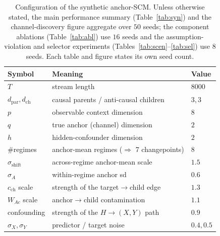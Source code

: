 \documentclass[authoryear,preprint,12pt]{elsarticle}
\theoremstyle{plain}
\theoremstyle{remark}
\begin{document}
\begin{table}[htbp]
\centering
\caption{Configuration of the synthetic anchor-SCM. Unless otherwise stated, the
main performance summary (Table~\ref{tab:syn}) and the channel-discovery figure
aggregate over $50$ seeds; the component ablations (Table~\ref{tab:abl}) use $16$
seeds and the assumption-violation and selector experiments
(Tables~\ref{tab:scen}--\ref{tab:sel}) use $8$ seeds. Each table and figure states
its own seed count.}
\label{tab:scm}
\small
\begin{tabular}{lll}
\toprule
Symbol & Meaning & Value\\
\midrule
$T$ & stream length & $8000$\\
$d_{\mathrm{par}},d_{\mathrm{ch}}$ & causal parents / anti-causal children & $3,3$\\
$p$ & observable context dimension & $8$\\
$q$ & true anchor (channel) dimension & $2$\\
$h$ & hidden-confounder dimension & $2$\\
\#regimes & anchor-mean regimes ($\Rightarrow$ 7 changepoints) & $8$\\
$\sigma_{\text{shift}}$ & across-regime anchor-mean scale & $1.5$\\
$\sigma_A$ & within-regime anchor sd & $0.6$\\
$c_{\mathrm{ch}}$ scale & strength of the target$\to$child edge & $1.3$\\
$W_{Ac}$ scale & anchor$\to$child contamination & $1.1$\\
confounding & strength of the $H\to(X,Y)$ path & $0.9$\\
$\sigma_X,\sigma_Y$ & predictor / target noise & $0.4,0.5$\\
\bottomrule
\end{tabular}
\end{table}
\end{document}
